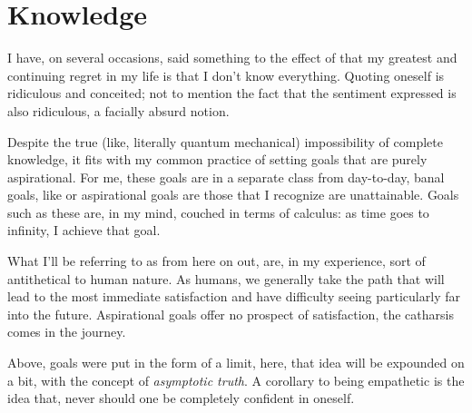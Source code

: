 \documentclass[../butidigress.tex]{subfiles}
\begin{document}
\chapter{Knowledge}\label{chap:knowledge}
\newpage

I have, on several occasions, said something to the effect of that my greatest and continuing regret in my life is that I don't know everything.
Quoting oneself is ridiculous and conceited; not to mention the fact that the sentiment expressed is also ridiculous, a facially absurd notion.

Despite the true (like, literally quantum mechanical) impossibility of complete knowledge, it fits with my common practice of setting goals that are purely aspirational.
For me, these goals are in a separate class from day-to-day, banal goals, like  or  aspirational goals are those that I recognize are unattainable.
Goals such as these are, in my mind, couched in terms of calculus: as time goes to infinity, I achieve that goal.

What I'll be referring to as  from here on out, are, in my experience, sort of antithetical to human nature.
As humans, we generally take the path that will lead to the most immediate satisfaction and have difficulty seeing particularly far into the future.
Aspirational goals offer no prospect of satisfaction, the catharsis comes in the journey.

Above, goals were put in the form of a limit, here, that idea will be expounded on a bit, with the concept of \emph{asymptotic truth}.
A corollary to being empathetic is the idea that, never should one be completely confident in oneself.
\end{document}
